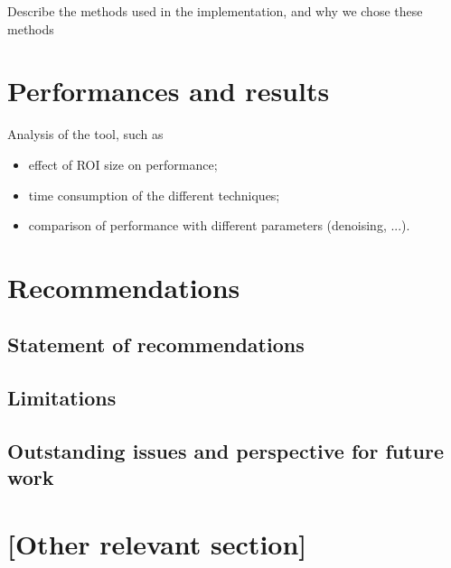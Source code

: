 \documentclass[11pt]{scrartcl}
\begin{document}
Describe the methods used in the implementation, and why we chose these methods



\section{Performances and results}
Analysis of the tool, such as
\begin{itemize}
\item effect of ROI size on performance;
\item time consumption of the different techniques;
\item comparison of performance with different parameters (denoising, ...).
\end{itemize}



\section{Recommendations}


\subsection{Statement of recommendations}


\subsection{Limitations}


\subsection{Outstanding issues and perspective for future work}




\section{[Other relevant section]}








\end{document}
